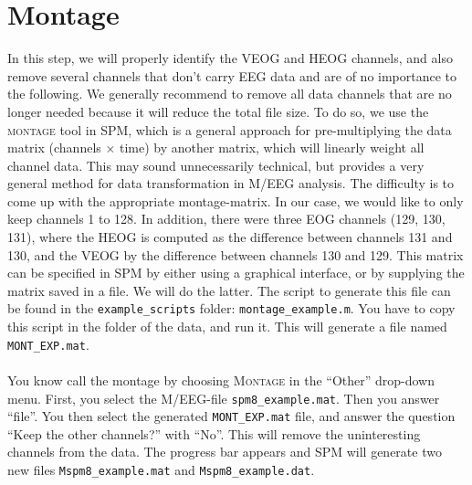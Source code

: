 \section{Montage}
In this step, we will properly identify the VEOG and HEOG channels, and also remove several channels that don't carry EEG data and are of no importance to the following. We generally recommend to remove all data channels that are no longer needed because it will reduce the total file size. To do so, we use the \textsc{montage} tool in SPM, which is a general approach for pre-multiplying the data matrix (channels $\times$ time) by another matrix, which will linearly weight all channel data. This may sound unnecessarily technical, but provides a very general method for data transformation in M/EEG analysis. The difficulty is to come up with the appropriate montage-matrix. In our case, we would like to only keep channels 1 to 128. In addition, there were three EOG channels (129, 130, 131), where the HEOG is computed as the difference between channels 131 and 130, and the VEOG by the difference between channels 130 and 129. This matrix can be specified in SPM by either using a graphical interface, or by supplying the matrix saved in a file. We will do the latter. The script to generate this file can be found in the \texttt{example\_scripts} folder: \texttt{montage\_example.m}. You have to copy this script in the folder of the data, and run it. This will generate a file named \texttt{MONT\_EXP.mat}.
\\
\\
You know call the montage by choosing \textsc{Montage} in the ``Other'' drop-down menu. First, you select the M/EEG-file \texttt{spm8\_example.mat}. Then you answer ``file''. You then select the generated \texttt{MONT\_EXP.mat} file, and answer the question ``Keep the other channels?'' with ``No''. This will remove the uninteresting channels from the data. The progress bar appears and SPM will generate two new files \texttt{Mspm8\_example.mat} and \texttt{Mspm8\_example.dat}.

